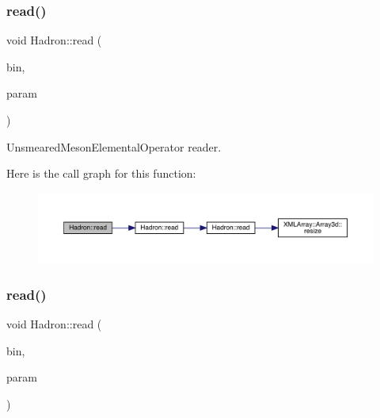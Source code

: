 \subsubsection{\texorpdfstring{read()}{read()}\hspace{0.1cm}{\footnotesize\ttfamily [73/94]}}
{\footnotesize\ttfamily void Hadron\+::read (\begin{DoxyParamCaption}\item[{\mbox{\hyperlink{classADATIO_1_1BinaryReader}{Binary\+Reader}} \&}]{bin,  }\item[{\mbox{\hyperlink{structHadron_1_1ValUnsmearedMesonElementalOperator__t}{Val\+Unsmeared\+Meson\+Elemental\+Operator\+\_\+t}} \&}]{param }\end{DoxyParamCaption})}



Unsmeared\+Meson\+Elemental\+Operator reader. 

Here is the call graph for this function\+:
\nopagebreak
\begin{figure}[H]
\begin{center}
\leavevmode
\includegraphics[width=350pt]{d1/daf/namespaceHadron_a0dee7d09d7d8dd3947cd5a0c3c4c0447_cgraph}
\end{center}
\end{figure}
\mbox{\label{namespaceHadron_a26908582ef57fc950c0944a69dfcc275}} 
\subsubsection{\texorpdfstring{read()}{read()}\hspace{0.1cm}{\footnotesize\ttfamily [74/94]}}
{\footnotesize\ttfamily void Hadron\+::read (\begin{DoxyParamCaption}\item[{\mbox{\hyperlink{classADATIO_1_1BinaryReader}{Binary\+Reader}} \&}]{bin,  }\item[{\mbox{\hyperlink{structHadron_1_1ValGenPropElementalOperator__t}{Val\+Gen\+Prop\+Elemental\+Operator\+\_\+t}} \&}]{param }\end{DoxyParamCaption})}



